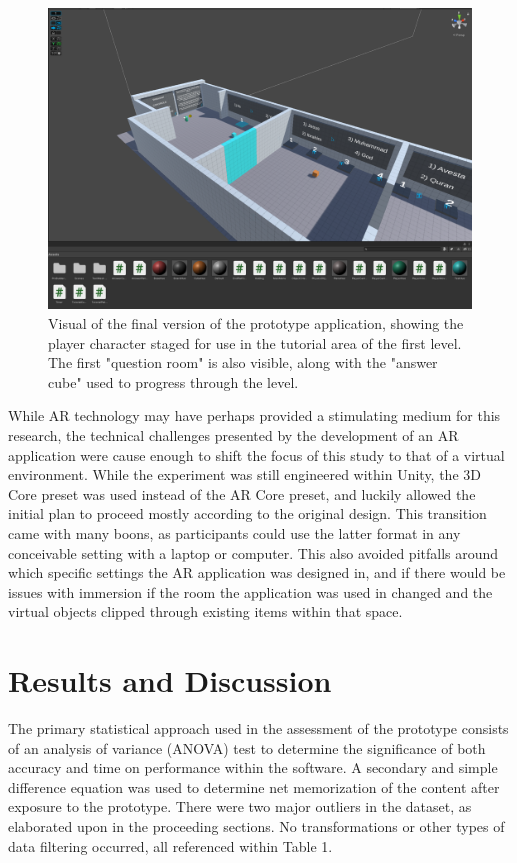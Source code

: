\documentclass{vgtc}                          %
\begin{document}
\begin{figure}[tb]
 \centering 
 \includegraphics[width=\linewidth]{FinalPrototype.png}
 \caption{Visual of the final version of the prototype application, showing the player character staged for use in the tutorial area of the first level. The first "question room" is also visible, along with the "answer cube" used to progress through the level.}
 \label{fig:sample}
\end{figure}

While AR technology may have perhaps provided a stimulating medium for this research, the technical challenges presented by the development of an AR application were cause enough to shift the focus of this study to that of a virtual environment. While the experiment was still engineered within Unity, the 3D Core preset was used instead of the AR Core preset, and luckily allowed the initial plan to proceed mostly according to the original design. This transition came with many boons, as participants could use the latter format in any conceivable setting with a laptop or computer. This also avoided pitfalls around which specific settings the AR application was designed in, and if there would be issues with immersion if the room the application was used in changed and the virtual objects clipped through existing items within that space.

\section{Results and Discussion}

The primary statistical approach  used in the assessment of the prototype consists of an analysis of variance (ANOVA) test to determine the significance of both accuracy and time on performance within the software. A secondary and simple difference equation was used to determine net memorization of the content after exposure to the prototype. There were two major outliers in the dataset, as elaborated upon in the proceeding sections. No transformations or other types of data filtering occurred, all referenced within Table 1.
\end{document}
